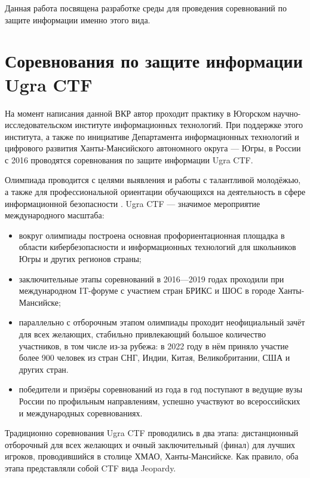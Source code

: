 
Данная работа посвящена разработке среды для проведения соревнований по защите информации именно этого вида.




\section{Соревнования по защите информации Ugra CTF}
\label{cha:analysis:ugractf}

На момент написания данной ВКР автор проходит практику в Югорском научно-исследовательском институте информационных технологий. При поддержке этого института, а также по инициативе Департамента информационных технологий и цифрового развития Ханты-Мансийского автономного округа — Югры, в России с 2016 проводятся соревнования по защите информации Ugra CTF.

Олимпиада проводится с целями выявления и работы с талантливой молодёжью, а также для профессиональной ориентации обучающихся на деятельность в сфере информационной безопасности \cite{Olymp}. Ugra CTF — значимое мероприятие международного масштаба:

\begin{itemize}
\item
  вокруг олимпиады построена основная профориентационная площадка в области кибербезопасности и информационных технологий для школьников Югры и других регионов страны;
\item
  заключительные этапы соревнований в 2016---2019 годах проходили при международном IT-форуме с участием стран БРИКС и ШОС в городе Ханты-Мансийске;
\item
  параллельно с отборочным этапом олимпиады проходит неофициальный зачёт для всех желающих, стабильно привлекающий большое количество участников, в том числе из-за рубежа: в 2022 году в нём приняло участие более 900 человек из стран СНГ, Индии, Китая, Великобритании, США и других стран.
\item
  победители и призёры соревнований из года в год поступают в ведущие вузы России по профильным направлениям, успешно участвуют во всероссийских и международных соревнованиях.
\end{itemize}

Традиционно соревнования Ugra CTF проводились в два этапа: дистанционный отборочный для всех желающих и очный заключительный (финал) для лучших игроков, проводившийся в столице ХМАО, Ханты-Мансийске. Как правило, оба этапа представляли собой CTF вида Jeopardy.


